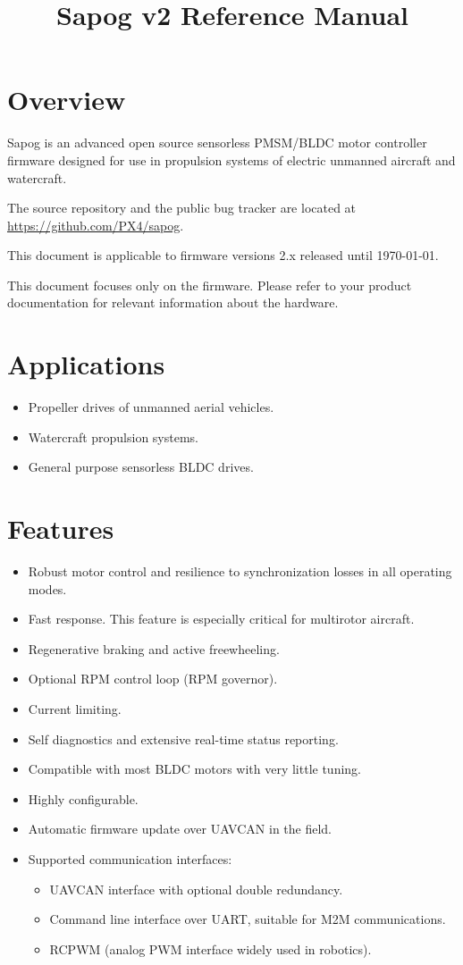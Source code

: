 \documentclass{zubaxdoc}
\title{Sapog v2 Reference Manual}
\begin{document}
\frontmatter

\begin{titlepage}
\section*{Overview}

Sapog is an advanced open source sensorless PMSM/BLDC motor controller firmware designed for
use in propulsion systems of electric unmanned aircraft and watercraft.

The source repository and the public bug tracker are located at
\url{https://github.com/PX4/sapog}.

This document is applicable to firmware versions 2.x released until \today.

This document focuses only on the firmware.
Please refer to your product documentation for relevant information about the hardware.

\section*{Applications}
\begin{itemize}
    \item Propeller drives of unmanned aerial vehicles.
    \item Watercraft propulsion systems.
    \item General purpose sensorless BLDC drives.
\end{itemize}

\BeginRightColumn
\section*{Features}
\begin{itemize}
    \item Robust motor control and resilience to synchronization losses in all operating modes.
    \item Fast response. This feature is especially critical for multirotor aircraft.
    \item Regenerative braking and active freewheeling.
    \item Optional RPM control loop (RPM governor).
    \item Current limiting.
    \item Self diagnostics and extensive real-time status reporting.
    \item Compatible with most BLDC motors with very little tuning.
    \item Highly configurable.
    \item Automatic firmware update over UAVCAN in the field.
    \item Supported communication interfaces:
    \begin{itemize}
        \item UAVCAN interface with optional double redundancy.
        \item Command line interface over UART, suitable for M2M communications.
        \item RCPWM (analog PWM interface widely used in robotics).
    \end{itemize}
\end{itemize}


\end{titlepage}
\end{document}
